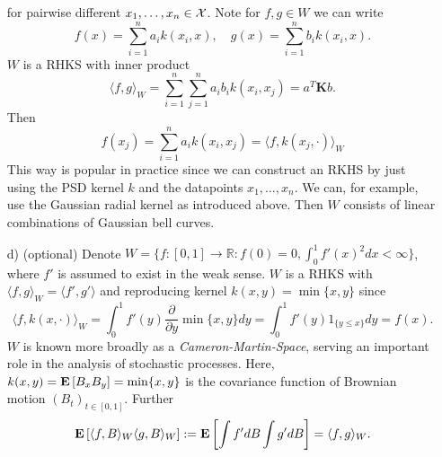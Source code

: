\begin{example}[RKHS]
\begin{itemize}
	for pairwise different $x_1, \ldots, x_n \in \mathcal{X}$. Note for $f, g \in W$ we can write
	\begin{equation*}
		f(x) = \sum_{i=1}^n a_i k(x_i, x), \quad g(x) = \sum_{i=1}^n b_i k(x_i, x).
	\end{equation*}
	$W$ is a RHKS with inner product
	\begin{equation*}
		\langle f, g \rangle_W = \sum_{i=1}^n\sum_{j=1}^n a_i b_i k(x_i, x_j) = a^T\mathbf{K}b.
	\end{equation*}
	Then					 
	\begin{equation*}
		f(x_j) = \sum_{i=1}^n a_i k(x_i, x_j) = \langle f, k(x_j, \cdot ) \rangle_W
	\end{equation*}
	This way is popular in practice since we can construct an RKHS by just using the PSD kernel $k$ and the datapoints $x_1, \ldots, x_n$. We can, for example, use the Gaussian radial kernel as introduced above. Then $W$ consists of linear combinations of Gaussian bell curves. %
	\item[d)] (optional) Denote $W = \{f \colon [0, 1] \rightarrow \mathbb{R} : f(0) = 0, \int_0^1 f'(x)^2 dx < \infty \}$, where $f'$ is assumed to exist in the weak sense. $W$ is a RHKS with $\langle f, g \rangle_W = \langle f', g' \rangle$ and reproducing kernel $k(x, y) = \min\{x, y\}$ since 
	\begin{equation*} 
		\langle f, k(x, \cdot) \rangle_W = \int_0^1 f'(y)\frac{\partial }{\partial y} \min\{x, y\}dy = \int_0^1 f'(y)1_{\{y \leq x\}} dy = f(x).
	\end{equation*}
	$W$ is known more broadly as a \emph{Cameron-Martin-Space}, serving an important role in the analysis of stochastic processes. Here, $k(x, y) = \mathbf{E}\left[B_xB_y \right] = \min\{x, y\}$ is the covariance function of Brownian motion $(B_t)_{t \in [0, 1]}$. Further 
	\begin{equation*}
		\mathbf{E}\left[\langle f, B \rangle_W \langle g, B  \rangle_W \right] := \mathbf{E}\left[\int f' dB \int g' dB \right] = \langle f, g \rangle_W.
	\end{equation*}
\end{itemize}
\end{example}

